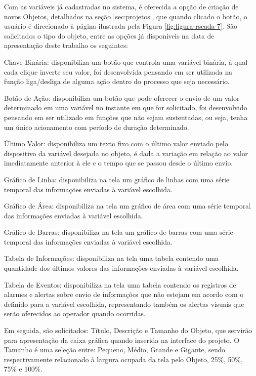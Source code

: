 Com as variáveis já cadastradas no sistema, é oferecida a opção de criação de novos Objetos, detalhados na seção \ref{sec:projetos}, que quando clicado o botão, o usuário é direcionado à página ilustrada pela Figura \ref{fig:figura-rscada-7}. São solicitados o tipo do objeto, entre as opções já disponíveis na data de apresentação deste trabalho os seguintes:

\begin{alineascomponto}
    \item Chave Binária: disponibiliza um botão que controla uma variável binária, à qual cada clique inverte seu valor, foi desenvolvida pensando em ser utilizada na função liga/desliga de alguma ação dentro do processo que seja necessário.
    \item Botão de Ação: disponibiliza um botão que pode oferecer o envio de um valor determinado em uma variável no instante em que for solicitado, foi desenvolvido pensando em ser utilizado em funções que não sejam sustentadas, ou seja, tenha um único acionamento com período de duração determinado.
    \item Último Valor: disponibiliza um texto fixo com o último valor enviado pelo dispositivo da variável desejada no objeto, é dada a variação em relação ao valor imediatamente anterior à ele e o tempo que se passou desde o último envio.
    \item Gráfico de Linha: disponibiliza na tela um gráfico de linhas com uma série temporal das informações enviadas à variável escolhida. 
    \item Gráfico de Área: disponibiliza na tela um gráfico de área com uma série temporal das informações enviadas à variável escolhida.
    \item Gráfico de Barras: disponibiliza na tela um gráfico de barras com uma série temporal das informações enviadas à variável escolhida.
    \item Tabela de Informações: disponibiliza na tela uma tabela contendo uma quantidade dos últimos valores das informações enviadas à variável escolhida.
    \item Tabela de Eventos:  disponibiliza na tela uma tabela contendo os registros de alarmes e alertas sobre envio de informações que não estejam em acordo com o definido para a variável escolhida, representando também os alertas visuais que serão oferecidos ao operador quando ocorridas.
\end{alineascomponto}

Em seguida, são solicitados: Título, Descrição e Tamanho do Objeto, que servirão para apresentação da caixa gráfica quando inserida na interface do projeto. O Tamanho é uma seleção entre: Pequeno, Médio, Grande e Gigante, sendo respectivamente relacionado à largura ocupada da tela pelo Objeto, 25\%, 50\%, 75\% e 100\%.


